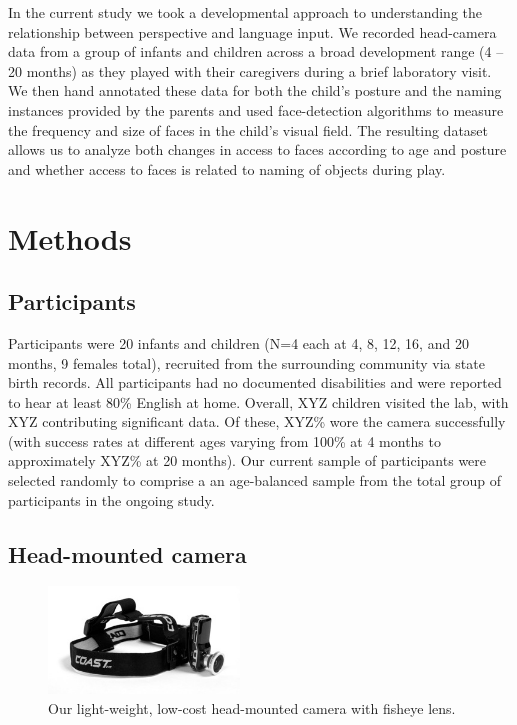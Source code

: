 \documentclass[10pt,letterpaper]{article}
\begin{document}
In the current study we took a developmental approach to understanding the relationship between perspective and language input. We recorded head-camera data from a group of infants and children across a broad development range (4 -- 20 months) as they played with their caregivers during a brief laboratory visit. We then hand annotated these data for both the child's posture and the naming instances provided by the parents and used face-detection algorithms to measure the frequency and size of faces in the child's visual field.  The resulting dataset allows us to analyze both changes in access to faces according to age and posture and whether access to faces is related to naming of objects during play. 

\section{Methods}

\subsection{Participants}

Participants were 20 infants and children (N=4 each at 4, 8, 12, 16, and 20 months, 9 females total), recruited from the surrounding community via state birth records. All participants had no documented disabilities and were reported to hear at least 80\% English at home. Overall, XYZ children visited the lab, with XYZ contributing significant data. Of these, XYZ\% wore the camera successfully (with success rates at different ages varying from 100\% at 4 months to approximately XYZ\% at 20 months). Our current sample of participants were selected randomly to comprise a an age-balanced sample from the total group of participants in the ongoing study.


\subsection{Head-mounted camera}

\begin{figure}
\centering
\includegraphics[width=2in]{figures/headcam_w_fisheye3.jpg}
\caption{\label{fig:headcam} Our light-weight, low-cost head-mounted camera with fisheye lens.} 
\end{figure}
\end{document}

